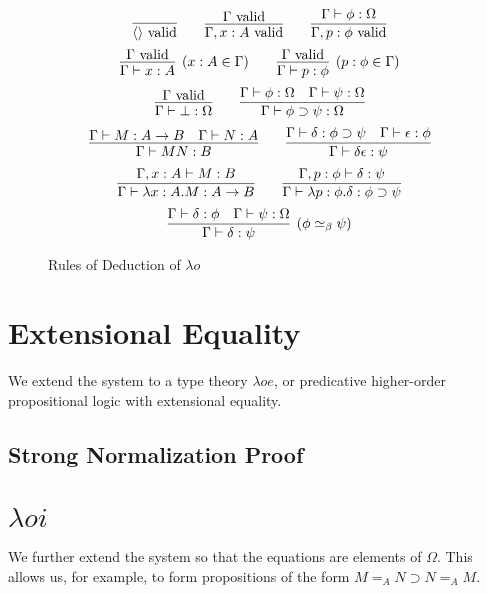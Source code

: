 \begin{figure}
\begin{framed}
\[ \infer{\langle \rangle \vald}{} \qquad
\infer{\Gamma, x : A \vald}{\Gamma \vald} \qquad 
\infer{\Gamma, p : \phi \vald}{\Gamma \vdash \phi : \Omega} \]
\[ \infer[(x : A \in \Gamma)]{\Gamma \vdash x : A}{\Gamma \vald} \qquad
\infer[(p : \phi \in \Gamma)]{\Gamma \vdash p : \phi}{\Gamma \vald} \]
\[ \infer{\Gamma \vdash \bot : \Omega}{\Gamma \vald} \qquad
\infer{\Gamma \vdash \phi \supset \psi : \Omega}{\Gamma \vdash \phi : \Omega \quad \Gamma \vdash \psi : \Omega} \]
\[ \infer{\Gamma \vdash M N : B} {\Gamma \vdash M : A \rightarrow B \quad \Gamma \vdash N : A} \qquad
\infer{\Gamma \vdash \delta \epsilon : \psi} {\Gamma \vdash \delta : \phi \supset \psi \quad \Gamma \vdash \epsilon : \phi} \]
\[ \infer{\Gamma \vdash \lambda x:A.M : A \rightarrow B}{\Gamma, x : A \vdash M : B} \qquad
\infer{\Gamma \vdash \lambda p : \phi . \delta : \phi \supset \psi}{\Gamma, p : \phi \vdash \delta : \psi} \]
\[ \infer[(\phi \simeq_\beta \psi)]{\Gamma \vdash \delta : \psi}{\Gamma \vdash \delta : \phi \quad \Gamma \vdash \psi : \Omega} \]
\end{framed}
\caption{Rules of Deduction of $\lambda o$}
\label{fig:lambdao}
\end{figure}

\section{Extensional Equality}

We extend the system to a type theory $\lambda o e$, or predicative higher-order propositional logic with extensional equality.







\subsection{Strong Normalization Proof}







\section{$\lambda o i$}

We further extend the system so that the equations are elements of $\Omega$.  This allows us, for example,
to form propositions of the form $M =_A N \supset N =_A M$.

